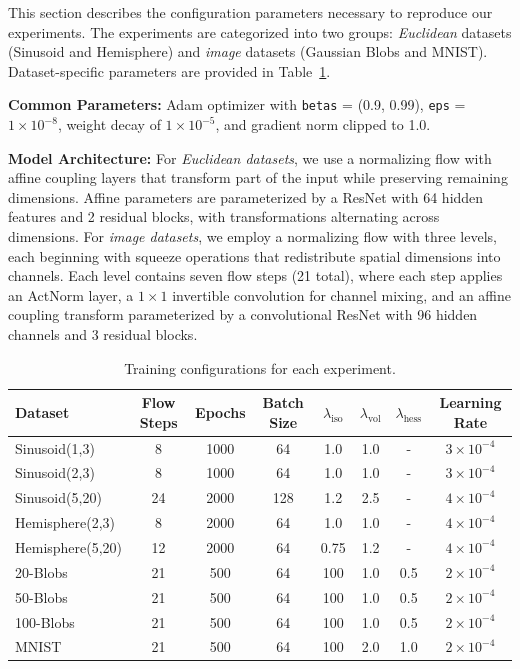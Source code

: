 This section describes the configuration parameters necessary to reproduce our experiments. The experiments are categorized into two groups: \textit{Euclidean} datasets (Sinusoid and Hemisphere) and \textit{image} datasets (Gaussian Blobs and MNIST). Dataset-specific parameters are provided in Table~\ref{tab:training_details}.

\textbf{Common Parameters:} Adam optimizer with \texttt{betas} = (0.9, 0.99), \texttt{eps} = $1 \times 10^{-8}$, weight decay of $1 \times 10^{-5}$, and gradient norm clipped to 1.0.

\textbf{Model Architecture:} For \textit{Euclidean datasets}, we use a normalizing flow with affine coupling layers that transform part of the input while preserving remaining dimensions. Affine parameters are parameterized by a ResNet with 64 hidden features and 2 residual blocks, with transformations alternating across dimensions. For \textit{image datasets}, we employ a normalizing flow with three levels, each beginning with squeeze operations that redistribute spatial dimensions into channels. Each level contains seven flow steps (21 total), where each step applies an ActNorm layer, a $1\times 1$ invertible convolution for channel mixing, and an affine coupling transform parameterized by a convolutional ResNet with 96 hidden channels and 3 residual blocks.


\begin{table}[htbp]
    \centering
    \caption{Training configurations for each experiment.}
    \label{tab:training_details}
    \begin{tabular}{|l|c|c|c|c|c|c|c|}
        \hline
        \textbf{Dataset} & \textbf{Flow Steps} & \textbf{Epochs} & \textbf{Batch Size} & $\lambda_{\text{iso}}$ & $\lambda_{\text{vol}}$ & $\lambda_{\text{hess}}$ & \textbf{Learning Rate} \\
        \hline
        Sinusoid(1,3)     & 8  & 1000  & 64  & 1.0  & 1.0  & -  & $3 \times 10^{-4}$ \\
        Sinusoid(2,3)     & 8  & 1000  & 64  & 1.0  & 1.0  & -  & $3 \times 10^{-4}$ \\
        Sinusoid(5,20)    & 24 & 2000  & 128 & 1.2  & 2.5  & -  & $4 \times 10^{-4}$ \\
        Hemisphere(2,3)   & 8  & 2000  & 64  & 1.0  & 1.0  & -  & $4 \times 10^{-4}$ \\
        Hemisphere(5,20)  & 12 & 2000  & 64  & 0.75 & 1.2  & -  & $4 \times 10^{-4}$ \\
        \hline
        20-Blobs          & 21  & 500  & 64  & 100  & 1.0  & 0.5  & $2 \times 10^{-4}$ \\
        50-Blobs          & 21  & 500  & 64  & 100  & 1.0  & 0.5  & $2 \times 10^{-4}$ \\
        100-Blobs         & 21  & 500  & 64  & 100  & 1.0  & 0.5  & $2 \times 10^{-4}$ \\
        MNIST             & 21  & 500  & 64  & 100  & 2.0  & 1.0  & $2 \times 10^{-4}$ \\
        \hline
    \end{tabular}
\end{table}

